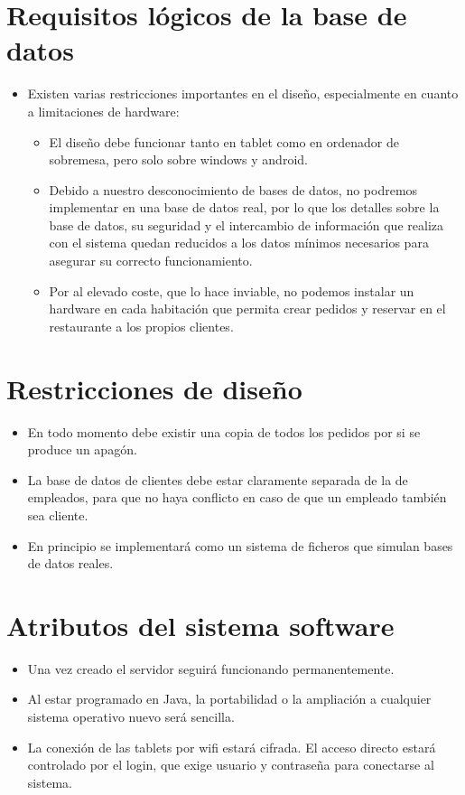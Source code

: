 \documentclass[spanish,a4paper,11pt, twoside]{report}	%
\begin{document}
\section{Requisitos lógicos de la base de datos}
\begin{itemize}
	\item Existen varias restricciones importantes en el diseño, especialmente en cuanto a limitaciones de hardware:
	\begin{itemize}
		\item El diseño debe funcionar tanto en tablet como en ordenador de sobremesa,  pero solo sobre windows y android.
		\item Debido a nuestro desconocimiento de bases de datos, no podremos implementar en una base de datos real, por lo que los detalles sobre la base de datos, su seguridad y el intercambio de información que realiza con el sistema quedan reducidos a los datos mínimos necesarios para asegurar su correcto funcionamiento.
		\item Por al elevado coste, que lo hace inviable, no podemos instalar un hardware en cada habitación que permita crear pedidos y reservar en el restaurante a los propios clientes.

	\end{itemize}
\end{itemize}

\section{Restricciones de diseño}
\begin{itemize}
	\item En todo momento debe existir una copia de todos los pedidos por si se produce 	un apagón.
	\item La base de datos de clientes debe estar claramente separada de la de empleados, para que no haya conflicto en caso de que un empleado también sea cliente.
	\item En principio se implementará como un sistema de ficheros que simulan bases de datos reales.
\end{itemize}


\section{Atributos del sistema software}
\begin{itemize}
	\item Una vez creado el servidor seguirá funcionando permanentemente.
	\item Al estar programado en Java, la portabilidad o la ampliación a cualquier sistema operativo  nuevo será sencilla. 
	\item La conexión de las tablets por wifi estará cifrada. El acceso directo estará controlado por el login, que exige usuario y contraseña para conectarse al sistema.
\end{itemize}


\newpage
\mbox{}
\thispagestyle{empty}						%
\newpage
\end{document}
